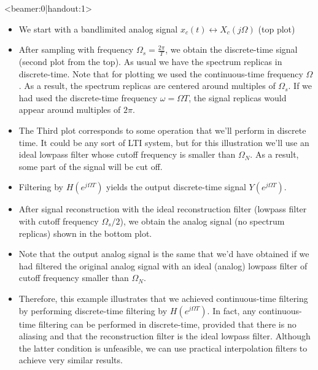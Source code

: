 \documentclass[10pt, aspectratio=169]{beamer}
\begin{document}
\begin{frame}<beamer:0|handout:1>
\fontsize{8pt}{7.2}\selectfont
\begin{itemize}
	\item We start with a bandlimited analog signal $x_c(t) \leftrightarrow X_c(j\Omega)$ (top plot)
	\item After sampling with frequency $\Omega_s = \frac{2\pi}{T}$, we obtain the discrete-time signal (second plot from the top). As usual we have the spectrum replicas in discrete-time. Note that for plotting we used the continuous-time frequency $\Omega$. As a result, the spectrum replicas are centered around multiples of $\Omega_s$. If we had used the discrete-time frequency $\omega = \Omega T$, the signal replicas would appear around multiples of $2\pi$.
	\item The Third plot corresponds to some operation that we'll perform in discrete time. It could be any sort of LTI system, but for this illustration we'll use an ideal lowpass filter whose cutoff frequency is smaller than $\Omega_N$. As a result, some part of the signal will be cut off.
	\item Filtering by $H(e^{j\Omega T})$ yields the output discrete-time signal $Y(e^{j\Omega T})$. 
	\item After signal reconstruction with the ideal reconstruction filter (lowpass filter with cutoff frequency $\Omega_s/2$), we obtain the analog signal (no spectrum replicas) shown in the bottom plot.
	\item Note that the output analog signal is the same that we'd have obtained if we had filtered the original analog signal with an ideal (analog) lowpass filter of cutoff frequency smaller than $\Omega_N$. 
	\item Therefore, this example illustrates that we achieved continuous-time filtering by performing discrete-time filtering by $H(e^{j\Omega T})$.  In fact, any continuous-time filtering can be performed in discrete-time, provided that there is no aliasing and that the reconstruction filter is the ideal lowpass filter. Although the latter condition is unfeasible, we can use practical interpolation filters to achieve very similar results.
\end{itemize}
\end{frame}
\end{document}
